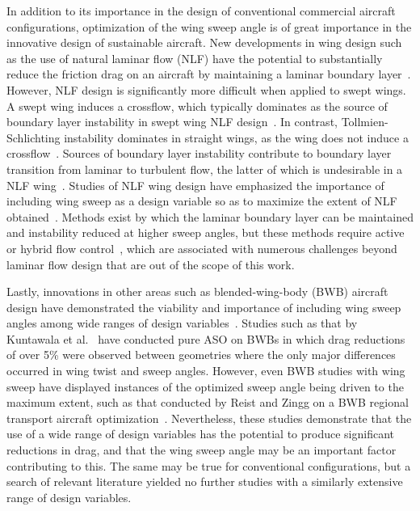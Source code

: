 In addition to its importance in the design of conventional commercial aircraft configurations, optimization of the wing sweep angle is of great importance in the innovative design of sustainable aircraft. New developments in wing design such as the use of natural laminar flow (NLF) have the potential to substantially reduce the friction drag on an aircraft by maintaining a laminar boundary layer~\cite{tokugawa_natural_2023}. However, NLF design is significantly more difficult when applied to swept wings. A swept wing induces a crossflow, which typically dominates as the source of boundary layer instability in swept wing NLF design~\cite{tokugawa_natural_2023}. In contrast, Tollmien-Schlichting instability dominates in straight wings, as the wing does not induce a crossflow~\cite{tokugawa_natural_2023}. Sources of boundary layer instability contribute to boundary layer transition from laminar to turbulent flow, the latter of which is undesirable in a NLF wing~\cite{tokugawa_natural_2023}. Studies of NLF wing design have emphasized the importance of including wing sweep as a design variable so as to maximize the extent of NLF obtained~\cite{tokugawa_natural_2023,campbell_natural_2016,lynde_computational_2017,sudhi_design_2023}. Methods exist by which the laminar boundary layer can be maintained and instability reduced at higher sweep angles, but these methods require active or hybrid flow control~\cite{campbell_natural_2016, lynde_computational_2017}, which are associated with numerous challenges beyond laminar flow design that are out of the scope of this work.

Lastly, innovations in other areas such as blended-wing-body (BWB) aircraft design have demonstrated the viability and importance of including wing sweep angles among wide ranges of design variables~\cite{kuntawala_preliminary_2011,reist_aerodynamic_2013,reist_optimization_2015,reist_aerodynamic_2016}. Studies such as that by Kuntawala et al.~\cite{kuntawala_preliminary_2011} have conducted pure ASO on BWBs in which drag reductions of over 5\% were observed between geometries where the only major differences occurred in wing twist and sweep angles. However, even BWB studies with wing sweep have displayed instances of the optimized sweep angle being driven to the maximum extent, such as that conducted by Reist and Zingg on a BWB regional transport aircraft optimization~\cite{reist_aerodynamic_2013}. Nevertheless, these studies demonstrate that the use of a wide range of design variables has the potential to produce significant reductions in drag, and that the wing sweep angle may be an important factor contributing to this. The same may be true for conventional configurations, but a search of relevant literature yielded no further studies with a similarly extensive range of design variables.

